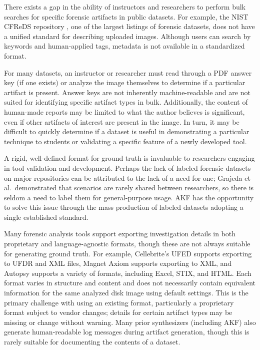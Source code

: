 There exists a gap in the ability of instructors and researchers to
perform bulk searches for specific forensic artifacts in public
datasets. For example, the NIST CFReDS repository
\cite{nationalinstituteofstandardsandtechnologyCFReDSPortal}, one of
the largest listings of forensic datasets, does not have a unified
standard for describing uploaded images. Although users can search by
keywords and human-applied tags, metadata is not available in a
standardized format.

For many datasets, an instructor or researcher must read through a PDF
answer key (if one exists) or analyze the image themselves to determine
if a particular artifact is present. Answer keys are not inherently
machine-readable and are not suited for identifying specific artifact
types in bulk. Additionally, the content of human-made reports may be
limited to what the author believes is significant, even if other
artifacts of interest are present in the image. In turn, it may be
difficult to quickly determine if a dataset is useful in demonstrating a
particular technique to students or validating a specific feature of a
newly developed tool.

A rigid, well-defined format for ground truth is invaluable to
researchers engaging in tool validation and development. Perhaps the
lack of labeled forensic datasets on major repositories can be
attributed to the lack of a need for one; Grajeda et al.~demonstrated
that scenarios are rarely shared between researchers, so there is seldom
a need to label them for general-purpose usage. AKF has the opportunity
to solve this issue through the mass production of labeled datasets
adopting a single established standard.

Many forensic analysis tools support exporting investigation details in
both proprietary and language-agnostic formats, though these are not
always suitable for generating ground truth. For example, Cellebrite's
UFED supports exporting to UFDR and XML files, Magnet Axiom supports
exporting to XML, and Autopsy supports a variety of formats, including
Excel, STIX, and HTML. Each format varies in structure and content and
does not necessarily contain equivalent information for the same
analyzed disk image using default settings. This is the primary
challenge with using an existing format, particularly a proprietary
format subject to vendor changes; details for certain artifact types may
be missing or change without warning. Many prior synthesizers (including
AKF) also generate human-readable log messages during artifact
generation, though this is rarely suitable for documenting the contents
of a dataset.

